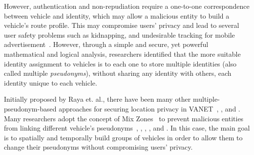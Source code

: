 \documentclass[preprint,12pt]{elsarticle}
\begin{document}
However, authentication and non-repudiation require a one-to-one correspondence between vehicle and identity, which may allow a malicious entity to build a vehicle's route profile. This may  compromise users' privacy and lead to several user safety problems such as kidnapping, and undesirable tracking for mobile advertisement~\cite{mix-zone-vanets}. However, through a simple and secure, yet powerful mathematical and logical analysis, researchers \cite{haas2010impact} identified that the more suitable identity assignment to vehicles is to each one to store multiple identities (also called multiple \textit{pseudonyms}), without sharing any identity with others, each identity unique to each vehicle.



Initially proposed by Raya et. al.\cite{keys-distro1}, there have been many other multiple-pseudonym-based approaches for securing location privacy in VANET~\cite{keys-distro2-thesis}, \cite{keys-distro8}, \cite{calandriello2007efficient} and  \cite{sun2010efficient}. Many researchers adopt the concept of Mix Zones~\cite{mix-zone} to prevent malicious entities from linking different vehicle's pseudonyms~\cite{lu2012pseudonym}, \cite{mix-zone-vanets}, \cite{buttyan2007effectiveness}, \cite{caravan}, \cite{buttyan2009slow} and \cite{mix-zone-motion}. In this case, the main goal is to spatially and temporally build groups of vehicles in order to allow them to change their pseudonyms without compromising users' privacy.
\end{document}
